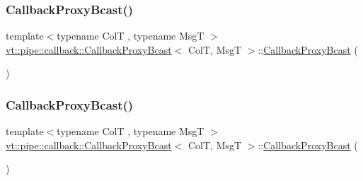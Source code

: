 \subsubsection{\texorpdfstring{Callback\+Proxy\+Bcast()}{CallbackProxyBcast()}\hspace{0.1cm}{\footnotesize\ttfamily [1/4]}}
{\footnotesize\ttfamily template$<$typename ColT , typename MsgT $>$ \\
\hyperlink{structvt_1_1pipe_1_1callback_1_1_callback_proxy_bcast}{vt\+::pipe\+::callback\+::\+Callback\+Proxy\+Bcast}$<$ ColT, MsgT $>$\+::\hyperlink{structvt_1_1pipe_1_1callback_1_1_callback_proxy_bcast}{Callback\+Proxy\+Bcast} (\begin{DoxyParamCaption}{ }\end{DoxyParamCaption})\hspace{0.3cm}{\ttfamily [default]}}

\mbox{\label{structvt_1_1pipe_1_1callback_1_1_callback_proxy_bcast_a196de6268c374af67345657d9cb2a8d4}} 
\subsubsection{\texorpdfstring{Callback\+Proxy\+Bcast()}{CallbackProxyBcast()}\hspace{0.1cm}{\footnotesize\ttfamily [2/4]}}
{\footnotesize\ttfamily template$<$typename ColT , typename MsgT $>$ \\
\hyperlink{structvt_1_1pipe_1_1callback_1_1_callback_proxy_bcast}{vt\+::pipe\+::callback\+::\+Callback\+Proxy\+Bcast}$<$ ColT, MsgT $>$\+::\hyperlink{structvt_1_1pipe_1_1callback_1_1_callback_proxy_bcast}{Callback\+Proxy\+Bcast} (\begin{DoxyParamCaption}\item[{\hyperlink{structvt_1_1pipe_1_1callback_1_1_callback_proxy_bcast}{Callback\+Proxy\+Bcast}$<$ ColT, MsgT $>$ const \&}]{ }\end{DoxyParamCaption})\hspace{0.3cm}{\ttfamily [default]}}

\mbox{\label{structvt_1_1pipe_1_1callback_1_1_callback_proxy_bcast_adbcbe9ba02478e813d43b53b26ffedd0}} 
